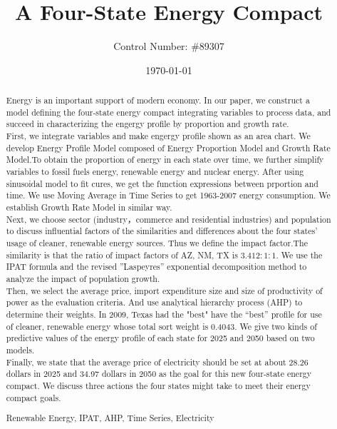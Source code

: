 \documentclass{mcmthesis}
\title{\textbf{A Four-State Energy Compact}}
\author{\small Control Number: \#89307}
\date{\today}
\begin{document}
\begin{abstract}
Energy is an important support of modern economy. In our paper, we construct a model defining the four-state energy compact integrating variables to process data, and succeed in characterizing the engergy profile by proportion and growth rate.\\
First, we integrate variables and make engergy profile shown as an area chart. We develop Energy Profile Model composed of Energy Proportion Model and Growth Rate Model.To obtain the proportion of energy in each state over time, we further simplify variables to fossil fuels energy, renewable energy and nuclear energy. After using sinusoidal model to fit cures, we get the function expressions between prportion and time. We use Moving Average in Time Series to get 1963-2007 energy consumption. We establish Growth Rate Model in similar way.\\
Next, we choose sector (industry，commerce and
residential industries) and population to discuss influential factors of the similarities and differences about the four states’ usage of cleaner, renewable energy sources. Thus we define the impact factor.The similarity is that the ratio of impact factors of AZ, NM, TX is $ 3.412 : 1 : 1 $. We use the IPAT formula and the revised ”Laspeyres” exponential decomposition method to analyze the impact of population growth.\\
Then, we select the average price, import expenditure size and size of productivity of power as the evaluation criteria. And use analytical hierarchy process (AHP) to determine their weights. In 2009, Texas had the "best" have the “best” profile for use of cleaner, renewable energy whose total sort weight is 0.4043. We give two kinds of predictive values of the energy profile of each state for 2025 and 2050 based on two models.\\
Finally, we state that the average price of electricity should be set at about 28.26 dollars in 2025 and 34.97 dollars in 2050 as the goal for this new four-state energy compact.
We discuss three actions the four states might take to meet their energy
compact goals.
\begin{keywords}
Renewable Energy, IPAT, AHP, Time Series, Electricity
\end{keywords}
\end{abstract}
\maketitle
\tableofcontents





%


%
\end{document}
